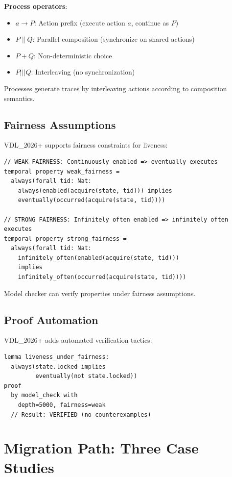 \documentclass[conference]{IEEEtran}
\begin{document}
\textbf{Process operators}:
\begin{itemize}
\item $a \to P$: Action prefix (execute action $a$, continue as $P$)
\item $P \parallel Q$: Parallel composition (synchronize on shared actions)
\item $P + Q$: Non-deterministic choice
\item $P \mathbin{|||} Q$: Interleaving (no synchronization)
\end{itemize}

Processes generate traces by interleaving actions according to composition semantics.

\subsection{Fairness Assumptions}

VDL\_2026+ supports fairness constraints for liveness:

\begin{lstlisting}[caption={Fairness in VDL\_2026+}]
// WEAK FAIRNESS: Continuously enabled => eventually executes
temporal property weak_fairness =
  always(forall tid: Nat:
    always(enabled(acquire(state, tid))) implies
    eventually(occurred(acquire(state, tid))))

// STRONG FAIRNESS: Infinitely often enabled => infinitely often executes
temporal property strong_fairness =
  always(forall tid: Nat:
    infinitely_often(enabled(acquire(state, tid)))
    implies
    infinitely_often(occurred(acquire(state, tid))))
\end{lstlisting}

Model checker can verify properties under fairness assumptions.

\subsection{Proof Automation}

VDL\_2026+ adds automated verification tactics:

\begin{lstlisting}[caption={Proof tactics}]
lemma liveness_under_fairness:
  always(state.locked implies
         eventually(not state.locked))
proof
  by model_check with
    depth=5000, fairness=weak
  // Result: VERIFIED (no counterexamples)
\end{lstlisting}

\section{Migration Path: Three Case Studies}
\label{sec:migration}
\end{document}
